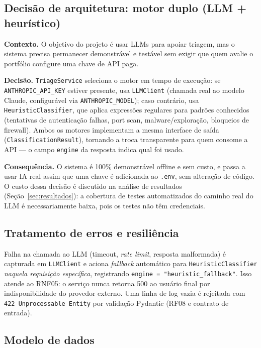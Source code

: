 \documentclass[11pt,a4paper]{article}
\begin{document}
\subsection{Decisão de arquitetura: motor duplo (LLM + heurístico)}

\textbf{Contexto.} O objetivo do projeto é usar LLMs para apoiar triagem, mas o sistema
precisa permanecer demonstrável e testável sem exigir que quem avalie o portfólio
configure uma chave de API paga.

\textbf{Decisão.} \texttt{TriageService} seleciona o motor em tempo de execução: se
\verb|ANTHROPIC_API_KEY| estiver presente, usa \texttt{LLMClient} (chamada real ao
modelo Claude, configurável via \verb|ANTHROPIC_MODEL|); caso contrário, usa
\texttt{HeuristicClassifier}, que aplica expressões regulares para padrões conhecidos
(tentativas de autenticação falhas, port scan, malware/exploração, bloqueios de
firewall). Ambos os motores implementam a mesma interface de saída
(\texttt{ClassificationResult}), tornando a troca transparente para quem consome a API
--- o campo \texttt{engine} da resposta indica qual foi usado.

\textbf{Consequência.} O sistema é 100\% demonstrável offline e sem custo, e passa a
usar IA real assim que uma chave é adicionada ao \texttt{.env}, sem alteração de
código. O custo dessa decisão é discutido na análise de resultados
(Seção~\ref{sec:resultados}): a cobertura de testes automatizados do caminho real do
LLM é necessariamente baixa, pois os testes não têm credenciais.

\subsection{Tratamento de erros e resiliência}

Falha na chamada ao LLM (timeout, \emph{rate limit}, resposta malformada) é capturada
em \texttt{LLMClient} e aciona \emph{fallback} automático para
\texttt{HeuristicClassifier} \emph{naquela requisição específica}, registrando
\texttt{engine = "heuristic\_fallback"}. Isso atende ao RNF05: o serviço nunca retorna
500 ao usuário final por indisponibilidade do provedor externo. Uma linha de log vazia
é rejeitada com \texttt{422 Unprocessable Entity} por validação Pydantic (RF08 e
contrato de entrada).

\subsection{Modelo de dados}
\end{document}
